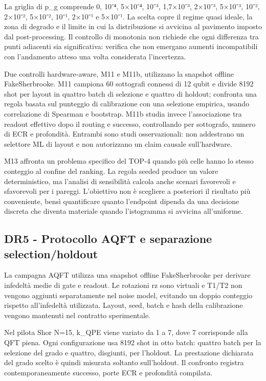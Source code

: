 La griglia di p\_g comprende 0, 10⁻⁴, 5×10⁻⁴, 10⁻³, 1,7×10⁻³, 2×10⁻³, 5×10⁻³, 10⁻², 2×10⁻², 5×10⁻², 10⁻¹, 2×10⁻¹ e 5×10⁻¹. La scelta copre il regime quasi ideale, la zona di degrado e il limite in cui la distribuzione si avvicina al pavimento imposto dal post-processing. Il controllo di monotonia non richiede che ogni differenza tra punti adiacenti sia significativa: verifica che non emergano aumenti incompatibili con l'andamento atteso una volta considerata l'incertezza.

Due controlli hardware-aware, M11 e M11b, utilizzano la snapshot offline FakeSherbrooke. M11 campiona 60 sottografi connessi di 12 qubit e divide 8192 shot per layout in quattro batch di selezione e quattro di holdout; confronta una regola basata sul punteggio di calibrazione con una selezione empirica, usando correlazione di Spearman e bootstrap. M11b studia invece l'associazione tra readout effettivo dopo il routing e successo, controllando per sottografo, numero di ECR e profondità. Entrambi sono studi osservazionali: non addestrano un selettore ML di layout e non autorizzano un claim causale sull'hardware.

M13 affronta un problema specifico del TOP-4 quando più celle hanno lo stesso conteggio al confine del ranking. La regola seeded produce un valore deterministico, ma l'analisi di sensibilità calcola anche scenari favorevoli e sfavorevoli per i pareggi. L'obiettivo non è scegliere a posteriori il risultato più conveniente, bensì quantificare quanto l'endpoint dipenda da una decisione discreta che diventa materiale quando l'istogramma si avvicina all'uniforme.

\subsection{DR5 - Protocollo AQFT e separazione selection/holdout}\label{sec:finale_3_5_6}

La campagna AQFT utilizza una snapshot offline FakeSherbrooke per derivare infedeltà medie di gate e readout. Le rotazioni rz sono virtuali e T1/T2 non vengono aggiunti separatamente nel noise model, evitando un doppio conteggio rispetto all'infedeltà utilizzata. Layout, seed, batch e hash della calibrazione vengono mantenuti nel contratto sperimentale.

Nel pilota Shor N=15, k\_QPE viene variato da 1 a 7, dove 7 corrisponde alla QFT piena. Ogni configurazione usa 8192 shot in otto batch: quattro batch per la selezione del grado e quattro, disgiunti, per l'holdout. La prestazione dichiarata del grado scelto è quindi misurata soltanto sull'holdout. Il confronto registra contemporaneamente successo, porte ECR e profondità compilata.

